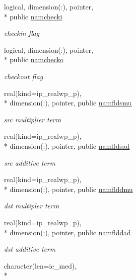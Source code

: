 \begin{DoxyCompactItemize}
logical, dimension(\+:), pointer, \\*
public \hyperlink{classmod__oasis__namcouple_a7c88a329c97aea020e9b135bdca8d160}{namchecki}
\begin{DoxyCompactList}\small\item\em checkin flag \end{DoxyCompactList}\item 
logical, dimension(\+:), pointer, \\*
public \hyperlink{classmod__oasis__namcouple_a58c011820e55c9af9f306fbb1d45eb23}{namchecko}
\begin{DoxyCompactList}\small\item\em checkout flag \end{DoxyCompactList}\item 
real(kind=ip\+\_\+realwp\+\_\+p), \\*
dimension(\+:), pointer, public \hyperlink{classmod__oasis__namcouple_ab52824ec91491253e02556a68ab31b09}{namfldsmu}
\begin{DoxyCompactList}\small\item\em src multiplier term \end{DoxyCompactList}\item 
real(kind=ip\+\_\+realwp\+\_\+p), \\*
dimension(\+:), pointer, public \hyperlink{classmod__oasis__namcouple_a1729dba99742412a1e07a479cb7f7921}{namfldsad}
\begin{DoxyCompactList}\small\item\em src additive term \end{DoxyCompactList}\item 
real(kind=ip\+\_\+realwp\+\_\+p), \\*
dimension(\+:), pointer, public \hyperlink{classmod__oasis__namcouple_ad81bb4f19a71f0fcf8655cb9d39a3380}{namflddmu}
\begin{DoxyCompactList}\small\item\em dst multipler term \end{DoxyCompactList}\item 
real(kind=ip\+\_\+realwp\+\_\+p), \\*
dimension(\+:), pointer, public \hyperlink{classmod__oasis__namcouple_af1e31f45ea1cd7a7b64a8a7dc2cec4ee}{namflddad}
\begin{DoxyCompactList}\small\item\em dst additive term \end{DoxyCompactList}\item 
character(len=ic\+\_\+med), \\*

\end{DoxyCompactItemize}
